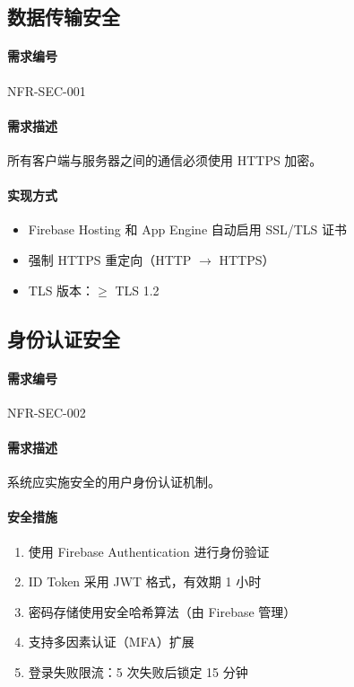 \subsection{数据传输安全}

\paragraph{需求编号} NFR-SEC-001

\paragraph{需求描述} 所有客户端与服务器之间的通信必须使用 HTTPS 加密。

\paragraph{实现方式}
\begin{itemize}
    \item Firebase Hosting 和 App Engine 自动启用 SSL/TLS 证书
    \item 强制 HTTPS 重定向（HTTP $\rightarrow$ HTTPS）
    \item TLS 版本：$\geq$ TLS 1.2
\end{itemize}

\subsection{身份认证安全}

\paragraph{需求编号} NFR-SEC-002

\paragraph{需求描述} 系统应实施安全的用户身份认证机制。

\paragraph{安全措施}
\begin{enumerate}
    \item 使用 Firebase Authentication 进行身份验证
    \item ID Token 采用 JWT 格式，有效期 1 小时
    \item 密码存储使用安全哈希算法（由 Firebase 管理）
    \item 支持多因素认证（MFA）扩展
    \item 登录失败限流：5 次失败后锁定 15 分钟
\end{enumerate}


